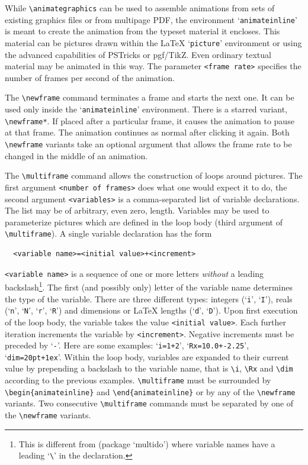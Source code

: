 \documentclass[a4paper]{article}
\begin{document}
While \verb+\animategraphics+ can be used to assemble animations from sets of existing graphics files or from multipage PDF, the environment `\verb+animateinline+' is meant to create the animation from the typeset material it encloses. This material can be pictures drawn within the \LaTeX{} `\verb+picture+' environment or using the advanced capabilities of PSTricks or pgf/TikZ. Even ordinary textual material may be animated in this way. The parameter \verb+<frame rate>+ specifies the number of frames per second of the animation.

The \verb+\newframe+ command terminates a frame and starts the next one. It can be used only inside the `\verb+animateinline+' environment. There is a starred variant, \verb+\newframe*+. If placed after a particular frame, it causes the animation to pause at that frame. The animation continues as normal after clicking it again. Both \verb+\newframe+ variants take an optional argument that allows the frame rate to be changed in the middle of an animation.

The \verb+\multiframe+ command allows the construction of loops around pictures. The first argument \verb+<number of frames>+ does what one would expect it to do, the second argument \verb+<variables>+ is a comma-separated list of variable declarations. The list may be of arbitrary, even zero, length. Variables may be used to parameterize pictures which are defined in the loop body (third argument of \verb+\multiframe+). A single variable declaration has the form
\begin{verbatim}
  <variable name>=<initial value>+<increment>
\end{verbatim}
\verb+<variable name>+ is a sequence of one or more letters \emph{without} a leading backslash\footnote{This is different from {\tt\string\multido} (package `multido') where variable names have a leading `{\tt\textbackslash}' in the declaration.}. The first (and possibly only) letter of the variable name determines the type of the variable. There are three different types: integers (`\verb+i+', `\verb+I+'), reals (`\verb+n+', `\verb+N+', `\verb+r+', `\verb+R+') and dimensions or \LaTeX{} lengths (`\verb+d+', `\verb+D+'). Upon first execution of the loop body, the variable takes the value \verb+<initial value>+. Each further iteration increments the variable by \verb+<increment>+. Negative increments must be preceded by `\verb+-+'. Here are some examples: `\verb:i=1+2:', `\verb:Rx=10.0+-2.25:', `\verb:dim=20pt+1ex:'. Within the loop body, variables are expanded to their current value by prepending a backslash to the variable name, that is \verb+\i+, \verb+\Rx+ and \verb+\dim+ according to the previous examples. \verb+\multiframe+ must be surrounded by \verb+\begin{animateinline}+ and \verb+\end{animateinline}+ or by any of the \verb+\newframe+ variants. Two consecutive \verb+\multiframe+ commands must be separated by one of the \verb+\newframe+ variants.
\end{document}
